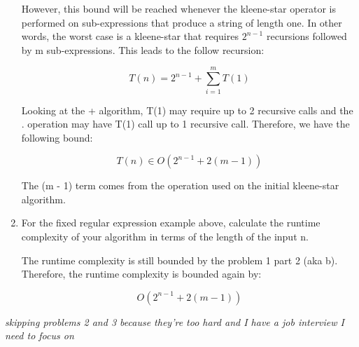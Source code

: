 \documentclass[11pt, letterpaper]{article}
\begin{document}
\begin{enumerate}
\quad However, this bound will be reached whenever the kleene-star operator is performed on sub-expressions that produce a string of length one. In other words, the worst case is a kleene-star that requires $2^{n - 1}$ recursions followed by m sub-expressions. This leads to the follow recursion:

$$ T(n) = 2^{n - 1} + \sum_{i = 1}^m T(1) $$

\quad Looking at the + algorithm, T(1) may require up to 2 recursive calls and the . operation may have T(1) call up to 1 recursive call. Therefore, we have the following bound:

$$ T(n) \in O(2^{n - 1} + 2{(m - 1)}) $$

\quad The (m - 1) term comes from the operation used on the initial kleene-star algorithm.

\item For the fixed regular expression example above, calculate the runtime complexity of your algorithm in terms of the length of the input n.

\quad The runtime complexity is still bounded by the problem 1 part 2 (aka b). Therefore, the runtime complexity is bounded again by:

$$ O(2^{n - 1} + 2(m - 1)) $$

\end{enumerate}

\pagebreak

\textit{skipping problems 2 and 3 because they're too hard and I have a job interview I need to focus on}
\end{document}
